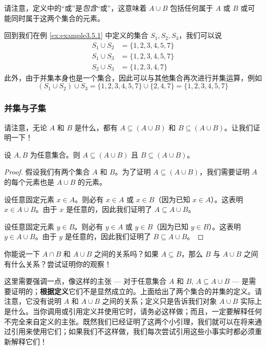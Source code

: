 请注意，定义中的``或''是\emph{包含}``或''，这意味着 $A \cup B$ 包括任何属于 $A$ 或 $B$ 或可能同时属于这两个集合的元素。

\begin{example}
    回到我们在例 \ref{ex:example3.5.1} 中定义的集合 $S_1, S_2, S_3$，我们可以说
    \begin{align*}
        S_1 \cup S_2 &= \{1, 2, 3, 4, 5, 7\} \\
        S_1 \cup S_3 &= \{1, 2, 3, 4, 5, 7\} \\
        S_2 \cup S_3 &= \{1, 2, 3, 4, 7\}
    \end{align*}
    此外，由于并集本身也是一个集合，因此可以与其他集合再次进行并集运算，例如
    \[(S_1 \cup S_2) \cup S_3 = \{1, 2, 3, 4, 5, 7\} \cup  \{2, 4, 7\} =  \{1, 2, 3, 4, 5, 7\}\]
\end{example}

\subsubsection*{并集与子集}

请注意，无论 $A$ 和 $B$ 是什么，都有 $A \subseteq (A \cup B)$ 和 $B \subseteq (A \cup B)$。让我们证明一下！

\begin{proposition}
    设 $A, B$ 为任意集合。则 $A \subseteq (A \cup B)$ 且 $B \subseteq (A \cup B)$。
\end{proposition}

\begin{proof}
    假设我们有两个集合 $A$ 和 $B$。为了证明 $A \subseteq (A \cup B)$，我们需要证明 $A$ 的每个元素也是 $A \cup B$ 的元素。

    设任意固定元素 $x \in A$。则必有 $x \in A$ 或 $x \in B$（因为已知 $x \in A$）。这表明 $x \in A \cup B$。由于 $x$ 是任意的，因此我们证明了 $A \subseteq A \cup B$。

    设任意固定元素 $y \in B$。则必有 $y \in A$ 或 $y \in B$（因为已知 $y \in B$）。这表明 $y \in A \cup B$。由于 $y$ 是任意的，因此我们证明了 $B \subseteq A \cup B$。
\end{proof}

你能说一下 $A \cap B$ 和 $A \cup B$ 之间的关系吗？如果 $A \subseteq B$，那么 $B$ 与 $A \cup B$ 之间有什么关系？尝试证明你的观察！

这里需要强调一点，像这样的主张 --- 对于任意集合 $A$ 和 $B$, $A \subseteq A \cup B$ --- 是需要证明的；\textbf{根据定义}它们不是显然成立的。上面给出了两个集合的并集的定义。请注意，它没有说明 $A$ 和 $A \cup B$ 之间的关系；定义只是告诉我们对象 $A \cup B$ 实际上是什么。当你调用或引用定义并使用它时，请务必这样做；而且，一定要解释任何不完全来自定义的主张。既然我们已经证明了这两个小引理，我们就可以在将来通过引用来使用它们；如果我们不这样做，我们每次尝试引用这些小事实时都必须重新解释它们！

